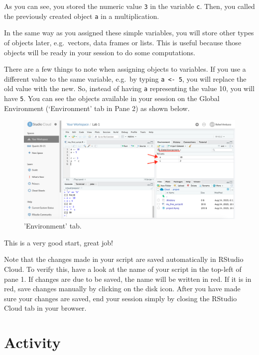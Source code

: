 \documentclass[
]{book}
\begin{document}
As you can see, you stored the numeric value \texttt{3} in the variable \texttt{c}. Then, you called the previously created object \texttt{a} in a multiplication.

In the same way as you assigned these simple variables, you will store other types of objects later, e.g.~vectors, data frames or lists. This is useful because those objects will be ready in your session to do some computations.

There are a few things to note when assigning objects to variables. If you use a different value to the same variable, e.g.~by typing \texttt{a\ \textless{}-\ 5}, you will replace the old value with the new. So, instead of having \texttt{a} representing the value 10, you will have \texttt{5}. You can see the objects available in your session on the Global Environment (`Environment' tab in Pane 2) as shown below.

\begin{figure}

\includegraphics[width=1\linewidth]{./images/rstudio_cloud_environment} \hfill{}

\caption{'Environment' tab.}\label{fig:unnamed-chunk-12}
\end{figure}

This is a very good start, great job!

Note that the changes made in your script are saved automatically in RStudio Cloud. To verify this, have a look at the name of your script in the top-left of pane 1. If changes are due to be saved, the name will be written in red. If it is in red, save changes manually by clicking on the disk icon. After you have made sure your changes are saved, end your session simply by closing the RStudio Cloud tab in your browser.

\hypertarget{activity}{%
\section{Activity}\label{activity}}
\end{document}
